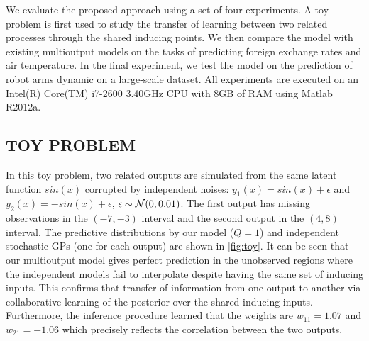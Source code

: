 We evaluate the proposed approach using a set of four experiments.
A toy problem is first used to study the transfer of learning between two related processes through the shared inducing points.
We then compare the model with existing multioutput models on the tasks of predicting foreign exchange rates and air temperature.
In the final experiment, we test the model on the prediction of robot arms dynamic on a large-scale dataset. 
All experiments are executed on an Intel(R) Core(TM) i7-2600 3.40GHz CPU with 8GB of RAM using Matlab R2012a.

\subsection{TOY PROBLEM}
In this toy problem, two related outputs are simulated from the same latent function $sin(x)$ corrupted by independent noises: $y_1(x) = sin(x) + \epsilon$ and $y_2(x) = -sin(x) + \epsilon$, $\epsilon \sim \mathcal{N}(0,0.01)$.
The first output has missing observations in the $(-7,-3)$ interval and the second output in the $(4,8)$ interval.
The predictive distributions by our model ($Q = 1$) and independent stochastic GPs (one for each output) are shown in \ref{fig:toy}.
It can be seen that our multioutput model gives perfect prediction in the unobserved regions where the independent models fail to interpolate despite having the same set of inducing inputs.
This confirms that transfer of information from one output to another via collaborative learning of the posterior over the shared inducing inputs.
Furthermore, the inference procedure learned that the weights are $w_{11} = 1.07$ and $w_{21} = -1.06$ which precisely reflects the correlation between the two outputs.


